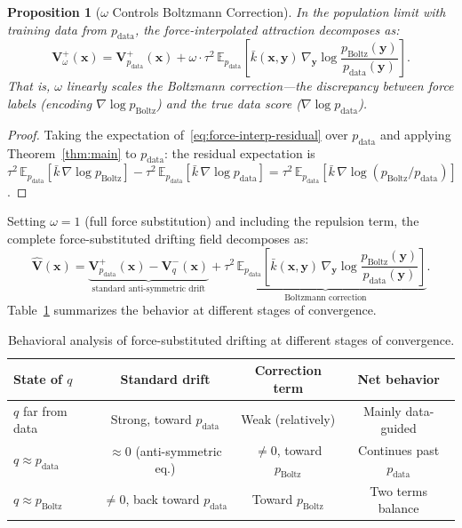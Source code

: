 \documentclass[11pt]{article}
\newtheorem{proposition}[theorem]{Proposition}
\newcommand{\bx}{\mathbf{x}}
\newcommand{\by}{\mathbf{y}}
\newcommand{\bV}{\mathbf{V}}
\newcommand{\E}{\mathbb{E}}
\newcommand{\kbar}{\bar{k}}
\newcommand{\pboltz}{p_{\text{Boltz}}}
\newcommand{\pdata}{p_{\text{data}}}
\begin{document}
\begin{proposition}[$\omega$ Controls Boltzmann Correction]
\label{prop:omega-controls}
In the population limit with training data from $\pdata$, the force-interpolated attraction decomposes as:
\begin{equation}
    \bV_\omega^+(\bx) = \bV_{\pdata}^+(\bx) + \omega \cdot \tau^2\,\E_{\pdata}\!\left[\kbar(\bx,\by)\,\nabla_\by\log\frac{\pboltz(\by)}{\pdata(\by)}\right].
    \label{eq:omega-decompose}
\end{equation}
That is, $\omega$ \emph{linearly scales} the Boltzmann correction---the discrepancy between force labels (encoding $\nabla\log\pboltz$) and the true data score ($\nabla\log\pdata$).
\end{proposition}

\begin{proof}
Taking the expectation of~\eqref{eq:force-interp-residual} over $\pdata$ and applying Theorem~\ref{thm:main} to $\pdata$:
the residual expectation is $\tau^2\,\E_{\pdata}[\kbar\,\nabla\log\pboltz] - \tau^2\,\E_{\pdata}[\kbar\,\nabla\log\pdata] = \tau^2\,\E_{\pdata}[\kbar\,\nabla\log(\pboltz/\pdata)]$.
\end{proof}

Setting $\omega = 1$ (full force substitution) and including the repulsion term, the complete force-substituted drifting field decomposes as:
\begin{equation}
    \hat{\bV}(\bx) = \underbrace{\bV_{\pdata}^+(\bx) - \bV_q^-(\bx)}_{\text{standard anti-symmetric drift}} + \underbrace{\tau^2\,\E_{\pdata}\!\left[\kbar(\bx,\by)\,\nabla_\by\log\frac{\pboltz(\by)}{\pdata(\by)}\right]}_{\text{Boltzmann correction}}.
    \label{eq:full-decompose}
\end{equation}
Table~\ref{tab:behavior} summarizes the behavior at different stages of convergence.

\begin{table}[t]
\centering
\caption{Behavioral analysis of force-substituted drifting at different stages of convergence.}
\label{tab:behavior}
\footnotesize
\setlength{\tabcolsep}{5pt}
\begin{tabular}{@{}lccc@{}}
\toprule
State of $q$ & Standard drift & Correction term & Net behavior \\
\midrule
$q$ far from data & Strong, toward $\pdata$ & Weak (relatively) & Mainly data-guided \\
$q \approx \pdata$ & $\approx 0$ (anti-symmetric eq.) & $\neq 0$, toward $\pboltz$ & Continues past $\pdata$ \\
$q \approx \pboltz$ & $\neq 0$, back toward $\pdata$ & Toward $\pboltz$ & Two terms balance \\
\bottomrule
\end{tabular}
\end{table}
\end{document}
